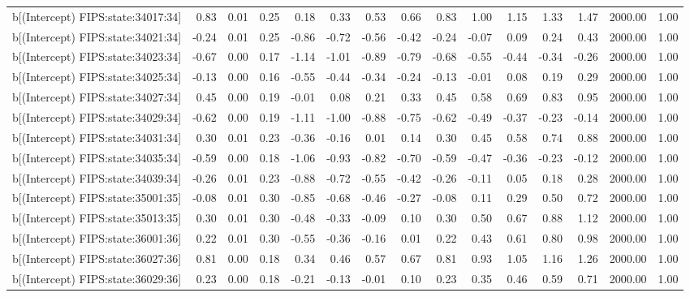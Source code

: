 \begin{table}[ht]
\begin{tabular}{rrrrrrrrrrrrrrr}
  b[(Intercept) FIPS:state:34017:34] & 0.83 & 0.01 & 0.25 & 0.18 & 0.33 & 0.53 & 0.66 & 0.83 & 1.00 & 1.15 & 1.33 & 1.47 & 2000.00 & 1.00 \\ 
  b[(Intercept) FIPS:state:34021:34] & -0.24 & 0.01 & 0.25 & -0.86 & -0.72 & -0.56 & -0.42 & -0.24 & -0.07 & 0.09 & 0.24 & 0.43 & 2000.00 & 1.00 \\ 
  b[(Intercept) FIPS:state:34023:34] & -0.67 & 0.00 & 0.17 & -1.14 & -1.01 & -0.89 & -0.79 & -0.68 & -0.55 & -0.44 & -0.34 & -0.26 & 2000.00 & 1.00 \\ 
  b[(Intercept) FIPS:state:34025:34] & -0.13 & 0.00 & 0.16 & -0.55 & -0.44 & -0.34 & -0.24 & -0.13 & -0.01 & 0.08 & 0.19 & 0.29 & 2000.00 & 1.00 \\ 
  b[(Intercept) FIPS:state:34027:34] & 0.45 & 0.00 & 0.19 & -0.01 & 0.08 & 0.21 & 0.33 & 0.45 & 0.58 & 0.69 & 0.83 & 0.95 & 2000.00 & 1.00 \\ 
  b[(Intercept) FIPS:state:34029:34] & -0.62 & 0.00 & 0.19 & -1.11 & -1.00 & -0.88 & -0.75 & -0.62 & -0.49 & -0.37 & -0.23 & -0.14 & 2000.00 & 1.00 \\ 
  b[(Intercept) FIPS:state:34031:34] & 0.30 & 0.01 & 0.23 & -0.36 & -0.16 & 0.01 & 0.14 & 0.30 & 0.45 & 0.58 & 0.74 & 0.88 & 2000.00 & 1.00 \\ 
  b[(Intercept) FIPS:state:34035:34] & -0.59 & 0.00 & 0.18 & -1.06 & -0.93 & -0.82 & -0.70 & -0.59 & -0.47 & -0.36 & -0.23 & -0.12 & 2000.00 & 1.00 \\ 
  b[(Intercept) FIPS:state:34039:34] & -0.26 & 0.01 & 0.23 & -0.88 & -0.72 & -0.55 & -0.42 & -0.26 & -0.11 & 0.05 & 0.18 & 0.28 & 2000.00 & 1.00 \\ 
  b[(Intercept) FIPS:state:35001:35] & -0.08 & 0.01 & 0.30 & -0.85 & -0.68 & -0.46 & -0.27 & -0.08 & 0.11 & 0.29 & 0.50 & 0.72 & 2000.00 & 1.00 \\ 
  b[(Intercept) FIPS:state:35013:35] & 0.30 & 0.01 & 0.30 & -0.48 & -0.33 & -0.09 & 0.10 & 0.30 & 0.50 & 0.67 & 0.88 & 1.12 & 2000.00 & 1.00 \\ 
  b[(Intercept) FIPS:state:36001:36] & 0.22 & 0.01 & 0.30 & -0.55 & -0.36 & -0.16 & 0.01 & 0.22 & 0.43 & 0.61 & 0.80 & 0.98 & 2000.00 & 1.00 \\ 
  b[(Intercept) FIPS:state:36027:36] & 0.81 & 0.00 & 0.18 & 0.34 & 0.46 & 0.57 & 0.67 & 0.81 & 0.93 & 1.05 & 1.16 & 1.26 & 2000.00 & 1.00 \\ 
  b[(Intercept) FIPS:state:36029:36] & 0.23 & 0.00 & 0.18 & -0.21 & -0.13 & -0.01 & 0.10 & 0.23 & 0.35 & 0.46 & 0.59 & 0.71 & 2000.00 & 1.00 \\ 

\end{tabular}
\end{table}
